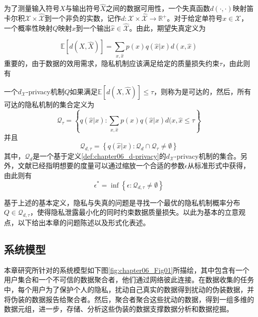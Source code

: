 为了测量输入符号$X$与输出符号$\hat{X}$之间的数据可用性，一个失真函数$d(\cdot,\cdot)$映射笛卡尔积$\mathcal{X}\times \hat{\mathcal{X}}$到一个非负的实数，记作$d:\mathcal{X}\times \hat{\mathcal{X}} \rightarrow \mathbb{R}^{+}$。对于给定单符号$x \in \mathcal{X}$，一个概率性映射$Q$映射$x$到一个输出$\hat{x} \in \hat{\mathcal{X}}$。由此，期望失真定义为

\begin{equation}
\mathbb{E}[d(X,\hat{X})] = \sum_{x,\hat{x}}p(x) q(\hat{x}|x)d(x,\hat{x})
\end{equation}
重要的，由于数据的效用需求，隐私机制应该满足给定的质量损失约束$\tau$，由此则有

\begin{definition}
	一个$d_{\mathcal{X}}$-privacy机制$Q$如果满足$\mathbb{E}[d(X,\hat{X})] \leq \tau$，则称为是可达的，然后，所有可达的隐私机制的集合定义为
	\begin{equation}
		\mathcal{Q}_{\tau} = \left\{q(\hat{x}|x):\sum_{x,\hat{x}}p(x) q(\hat{x}|x)d(x,\hat{x} \leq \tau \right\}
	\end{equation}
并且
\begin{equation}
	\mathcal{Q}_{d,\tau}=\left \{q(\hat{x}|x):\mathcal{Q}_{d} \cap \mathcal{Q}_{\tau} \neq \emptyset \right\}
\end{equation}
其中，$\mathcal{Q}_d$是一个基于定义\textup{\ref{def:chapter06_d-privacy}}的$d_{\mathcal{X}}$-privacy机制的集合。另外，文献\textup{}已经指明想要的度量可以通过缩放一个合适的参数$\epsilon$从标准形式中获得，由此则有
\begin{equation}
\epsilon^* = \inf\left\{\epsilon: \mathcal{Q}_{d,\tau} \neq \emptyset \right\}
\end{equation}
\end{definition}

基于上述的基本定义，隐私与失真的问题是寻找一个最优的隐私机制概率分布$Q \in \mathcal{Q}_{d,\tau}$，使得隐私泄露最小化的同时约束数据质量损失。以此为基本的立意观点，以下给出本章的问题陈述以及形式化表述。

\subsection{系统模型}\label{subsec:system_model}
本章研究所针对的系统模型如下图\ref{fig:chapter06_Fig01}所描绘，其中包含有一个用户集合和一个不可信的数据聚合者，他们通过网络彼此连接。在数据收集的任务中，每个用户为了保护个人的隐私，扰动自己真实的数据得到扰动的伪装数据，并将伪装的数据报告给聚合者。然后，聚合者聚合这些扰动的数据，得到一组多维的数据元组，进一步，存储、分析这些伪装的数据支撑数据分析和数据挖掘。

